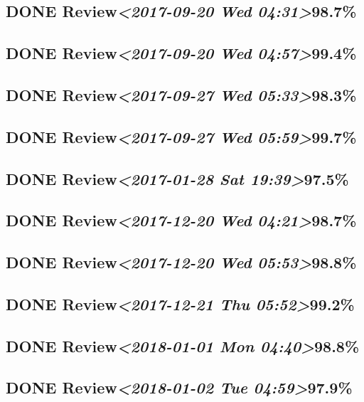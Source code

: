 \documentclass[11pt]{ctexart}
\begin{document}
\subsection{{\bfseries\sffamily DONE} Review\textit{<2017-09-20 Wed 04:31>}98.7\%}
\label{sec:orgfcb7c5c}
\subsection{{\bfseries\sffamily DONE} Review\textit{<2017-09-20 Wed 04:57>}99.4\%}
\label{sec:org1ca6873}
\subsection{{\bfseries\sffamily DONE} Review\textit{<2017-09-27 Wed 05:33>}98.3\%}
\label{sec:org46184f9}
\subsection{{\bfseries\sffamily DONE} Review\textit{<2017-09-27 Wed 05:59>}99.7\%}
\label{sec:orga703d04}
\subsection{{\bfseries\sffamily DONE} Review\textit{<2017-01-28 Sat 19:39>}97.5\%}
\label{sec:org5b951ae}

\subsection{{\bfseries\sffamily DONE} Review\textit{<2017-12-20 Wed 04:21>}98.7\%}
\label{sec:org3b287e6}
\subsection{{\bfseries\sffamily DONE} Review\textit{<2017-12-20 Wed 05:53>}98.8\%}
\label{sec:org31a1c5d}
\subsection{{\bfseries\sffamily DONE} Review\textit{<2017-12-21 Thu 05:52>}99.2\%}
\label{sec:orga5cc0bb}
\subsection{{\bfseries\sffamily DONE} Review\textit{<2018-01-01 Mon 04:40>}98.8\%}
\label{sec:orga60cdd7}
\subsection{{\bfseries\sffamily DONE} Review\textit{<2018-01-02 Tue 04:59>}97.9\%}
\label{sec:orgac03311}
\end{document}
